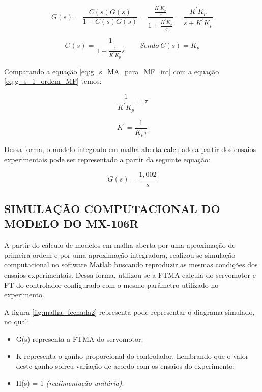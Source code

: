 \documentclass[12pt,oneside,a4paper, chapter=TITLE, section = TITLE, english, brazil]{abntex2}
\begin{document}
$$G(s) = \frac{C(s)G(s)}{1 + C(s)G(s)} = \frac{\frac{K^{'} K_{p}}{s}}{1 + \frac{K^{'} K_{p}}{s}} = \frac{K^{'} K_{p}}{s +  K^{'} K_{p}}$$

\begin{equation}
G(s) = \frac{1}{1 + \frac{1}{K^{'} K_{p}} s} \label{eq:g_s_MA_para_MF_int} \qquad Sendo \ C(s) = K_{p}
\end{equation}

Comparando a equação \ref{eq:g_s_MA_para_MF_int} com a equação \ref{eq:g_s_1_ordem_MF} temos:

$$ \frac{1}{K^{'} K_{p}} = \tau $$

\begin{equation}
K^{'} = \frac{1}{K_{p} \tau}
\end{equation}

Dessa forma, o modelo integrado em malha aberta calculado a partir dos ensaios experimentais pode ser representado a partir da seguinte equação:

$$ G(s) = \frac{1,002}{s} $$

\subsection{SIMULAÇÃO COMPUTACIONAL DO MODELO DO MX-106R}

A partir do cálculo de modelos em malha aberta por uma aproximação de primeira ordem e por uma aproximação integradora, realizou-se simulação computacional no software Matlab buscando reproduzir as mesmas condições dos ensaios experimentais. Dessa forma, utilizou-se a FTMA calcula do servomotor e FT do controlador configurado com o mesmo parâmetro utilizado no experimento.

A figura \ref{fig:malha_fechada2} representa pode representar o diagrama simulado, no qual:

\begin{itemize}

\item G(s) representa a FTMA do servomotor;

\item K representa o ganho proporcional do controlador. Lembrando que o valor deste ganho sofreu variação de acordo com os ensaios do experimento;

\item H(s) = 1 \textit{(realimentação unitária)}.
\\

\end{itemize}
\end{document}
